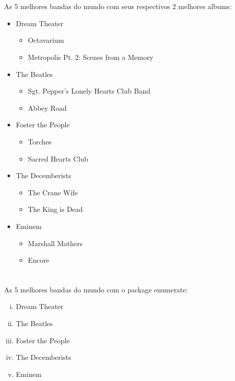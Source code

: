 \documentclass[a4paper,11pt]{report}
\begin{document}
\section{}
\begin{samepage}
As 5 melhores bandas do mundo com seus respectivos 2 melhores albums:
\begin{itemize}
\item Dream Theater
	\begin{itemize}
	\item Octavarium
	\item Metropolis Pt. 2: Scenes from a Memory
	\end{itemize}
\item The Beatles
	\begin{itemize}
	\item Sgt. Pepper's Lonely Hearts Club Band
	\item Abbey Road
	\end{itemize}
\item Foster the People
	\begin{itemize}
	\item Torches
	\item Sacred Hearts Club
	\end{itemize}
\item The Decemberists
	\begin{itemize}
	\item The Crane Wife
	\item The King is Dead
	\end{itemize}
\item Eminem
	\begin{itemize}
	\item Marshall Mathers
	\item Encore
	\end{itemize}
\end{itemize}
\end{samepage}
\section{}
\begin{samepage}
As 5 melhores bandas do mundo com o package enumerate: %
\begin{enumerate}[i)]
\item Dream Theater
\item The Beatles
\item Foster the People
\item The Decemberists
\item Eminem
\end{enumerate}
\end{samepage}
\end{document}
